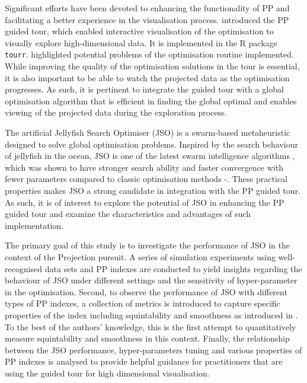 \documentclass[
  number,
  preprint,
  3p]{elsarticle}
\begin{document}
Significant efforts have been devoted to enhancing the functionality of
PP and facilitating a better experience in the visualisation process.
\citet{cook1995grand} introduced the PP guided tour, which enabled
interactive visualisation of the optimisation to visually explore
high-dimensional data. It is implemented in the R \citep{R} package
\texttt{tourr}\citep{tourr}. \citet{RJ-2021-105} highlighted potential
problems of the optimisation routine implemented. While improving the
quality of the optimisation solutions in the tour is essential, it is
also important to be able to watch the projected data as the
optimisation progresses. As such, it is pertinent to integrate the
guided tour with a global optimisation algorithm that is efficient in
finding the global optimal and enables viewing of the projected data
during the exploration process.

The artificial Jellyfish Search Optimiser (JSO) \citep{chou_novel_2021}
is a swarm-based metaheuristic designed to solve global optimisation
problems. Inspired by the search behaviour of jellyfish in the ocean,
JSO is one of the latest swarm intelligence algorithms
\citep{rajwar_exhaustive_2023}, which was shown to have stronger search
ability and faster convergence with fewer parameters compared to classic
optimisation methods \citep{chou_novel_2021}-\citep{chou_recent_2022}.
These practical properties makes JSO a strong candidate in integration
with the PP guided tour. As such, it is of interest to explore the
potential of JSO in enhancing the PP guided tour and examine the
characteristics and advantages of such implementation.

The primary goal of this study is to investigate the performance of JSO
in the context of the Projection pursuit. A series of simulation
experiments using well-recognised data sets and PP indexes are conducted
to yield insights regarding the behaviour of JSO under different
settings and the sensitivity of hyper-parameter in the optimisation.
Second, to observe the performance of JSO with different types of PP
indexes, a collection of metrics is introduced to capture specific
properties of the index including squintability and smoothness as
introduced in \citet{laa_using_2020}. To the best of the authors'
knowledge, this is the first attempt to quantitatively measure
squintability and smoothness in this context. Finally, the relationship
between the JSO performance, hyper-parameters tuning and various
properties of PP indexes is analysed to provide helpful guidance for
practitioners that are using the guided tour for high dimensional
visualisation.
\end{document}

